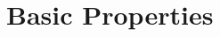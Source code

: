 \begingroup
    \ifcsname\PATH\endcsname
        \newcommand{\PATH}{books/Algebra/Fields}
        \newcommand{\OLDPATH}{\PATH}
    \else
        \newcommand{\OLDPATH}{\PATH}
        \renewcommand{\PATH}{books/Algebra/Fields}
    \fi
    \chapter{Basic Properties}
        

    \renewcommand{\PATH}{\OLDPATH}
\endgroup